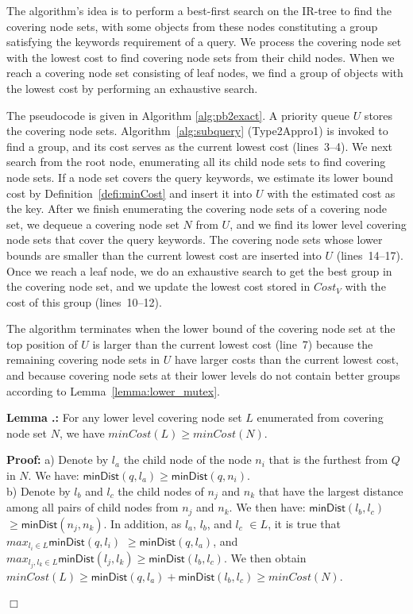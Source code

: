 \documentclass{sig-alternate}
\newcommand{\minDist}{\mbox{$\mathsf{minDist}$}\xspace}
\newcounter{theorem}[section]
\renewcommand{\thetheorem}{\nthesection.\arabic{theorem}}
\renewenvironment{proof}{
    {\vspace{1ex} \noindent\bf  Proof:}}{
    \eop \vspace{1ex} }
\newenvironment{lemma}{\begin{em}
    \refstepcounter{theorem}
    {\vspace{1ex} \noindent\bf  Lemma  \thetheorem:}}{
    \end{em}\eop\vspace{1ex}} %
\newcommand{\nthesection}{\arabic{section}}
\newcommand{\eop}{\hspace*{\fill}\mbox{$\Box$}}
\renewenvironment{proof}{
    {\vspace{1ex} \noindent\bf  Proof:}}{
    \vspace{1ex} }
\begin{document}
The algorithm's idea is to perform a best-first search on the
IR-tree to find the covering node sets, with some objects from these
nodes constituting a group satisfying the keywords requirement of a
query.
%
We process the covering node set with the lowest cost to find
covering node sets from their child nodes. When we reach a
covering node set consisting of leaf nodes, we find a group of
objects with the lowest cost by performing an exhaustive search.

The pseudocode is given in Algorithm \ref{alg:pb2exact}. A priority
queue $U$ stores the covering node sets.
%
Algorithm~\ref{alg:subquery} (\textsf{Type2Appro1}) is invoked to
find a group, and its cost serves as the current lowest cost (lines~3--4).
%
We next search from the root node, enumerating all its child node
sets to find covering node sets. If a node set covers the query
keywords, we estimate its lower bound cost by
Definition~\ref{defi:minCost} and insert it into $U$ with the estimated cost
as the key.
%
After we finish enumerating the covering node sets of a covering
node set, we dequeue a covering node set $N$ from $U$,
and we find its lower level covering node sets that cover the query
keywords. The covering node sets whose lower bounds are smaller
than the current lowest cost are inserted into $U$
(lines~14--17).
%
Once we reach a leaf node, we do an exhaustive search to get the
best group in the covering node set, and we update the lowest cost
stored in $Cost_V$ with the cost of this group (lines~10--12).

The algorithm terminates when the lower bound of the covering node set
at the top position of $U$ is larger than the current lowest
cost (line~7) because the remaining covering node sets in $U$ have
larger costs than the current lowest cost, and because covering
node sets at their lower levels do not contain better groups
according to Lemma~\ref{lemma:lower_mutex}.

\begin{lemma}\label{lemma:lower_mutex}
For any lower level covering node set $L$ enumerated from covering
node set $N$, we have $minCost(L) \geq minCost(N)$.

\begin{proof}
a) Denote by $l_a$ the child node of the node $n_i$ that is the
furthest from $Q$ in $N$. We have:
$\minDist(q, l_a) \geq \minDist(q, n_i)$.\\
b) Denote by $l_b$ and $l_c$ the child nodes of $n_j$ and $n_k$ that
have the largest distance among all pairs of child nodes from $n_j$ and $n_k$.
We then have: $\minDist(l_b, l_c)$ $\geq  \minDist(n_j, n_k)$.
%
In addition, as $l_a$, $l_b$, and  $l_c$ $\in L$, it is true that $max_{l_i \in
L}\minDist(q, l_i)$ $\geq \minDist(q, l_a)$, and $max_{l_j, l_k \in
L} \minDist(l_j, l_k) \geq \minDist(l_b, l_c)$. We then obtain
$minCost(L) \geq \minDist(q, l_a) + \minDist(l_b, l_c)\geq minCost(N)$.
\end{proof}
\end{lemma}
\end{document}
